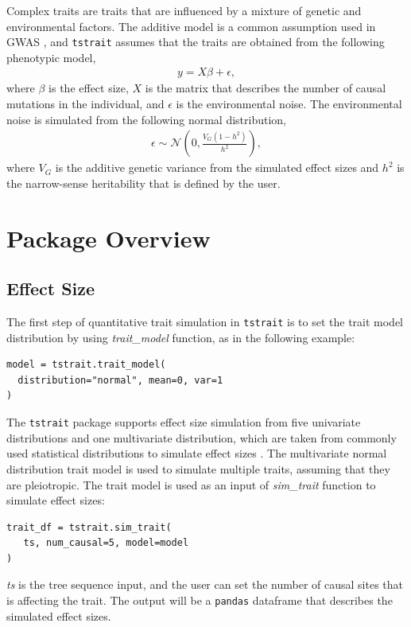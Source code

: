 \documentclass[unnumsec,webpdf,modern,large,namedate]{oup-authoring-template}%
\theoremstyle{thmstyleone}%
\theoremstyle{thmstyletwo}%
\theoremstyle{thmstylethree}%
\begin{document}
Complex traits are traits that are influenced by a mixture of genetic and
environmental factors. The additive model is a common assumption used in GWAS
\citep{uffelmann2021}, and \texttt{tstrait} assumes that the traits are
obtained from the following phenotypic model,
\begin{align}\label{eq:additive-model}
    y=X\beta+\epsilon,
\end{align}
where $\beta$ is the effect size, $X$ is the matrix that describes the number
of causal mutations in the individual, and $\epsilon$ is the environmental
noise. The environmental noise is simulated from the following normal
distribution,
\begin{align}\label{eq:env}
    \epsilon\sim \mathcal{N}\left(0,\frac{V_G(1-h^2)}{h^2}\right),
\end{align}
where $V_G$ is the additive genetic variance from the simulated effect sizes
and $h^2$ is the narrow-sense heritability that is defined by the user.

\section{Package Overview}

\subsection{Effect Size}

The first step of quantitative trait simulation in \texttt{tstrait} is to set
the trait model distribution by using \emph{trait\_model} function, as in the
following example:
\begin{verbatim}
model = tstrait.trait_model(
  distribution="normal", mean=0, var=1
)
\end{verbatim}
The \texttt{tstrait} package supports effect size simulation from five
univariate distributions and one multivariate distribution, which are taken
from commonly used statistical distributions to simulate effect sizes
\citep{gaynor2021,haller2023}. The multivariate normal distribution trait model
is used to simulate multiple traits, assuming that they are pleiotropic. The
trait model is used as an input of \emph{sim\_trait} function to simulate
effect sizes:
\begin{verbatim}
trait_df = tstrait.sim_trait(
   ts, num_causal=5, model=model
)
\end{verbatim}
\emph{ts} is the tree sequence input, and the user can set the number of causal
sites that is affecting the trait. The output will be a \texttt{pandas}
dataframe \citep{pandas} that describes the simulated effect sizes.
\end{document}
